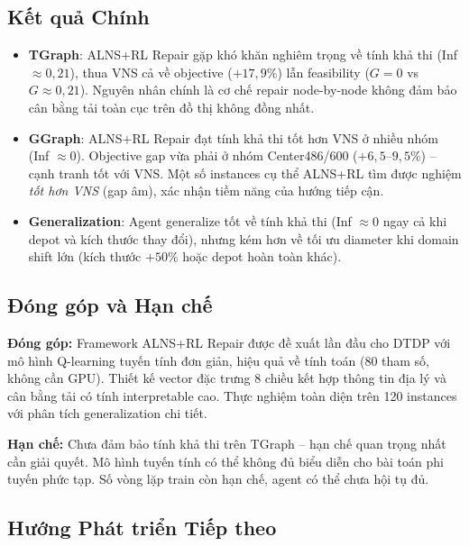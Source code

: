 \documentclass[12pt, a4paper]{article}
\begin{document}
\subsection{Kết quả Chính}

\begin{itemize}
  \item \textbf{TGraph}: ALNS+RL Repair gặp khó khăn nghiêm trọng về tính khả thi
        (Inf $\approx 0{,}21$), thua VNS cả về objective ($+17{,}9\%$) lẫn
        feasibility ($G = 0$ vs $G \approx 0{,}21$). Nguyên nhân chính là cơ chế
        repair node-by-node không đảm bảo cân bằng tải toàn cục trên đồ thị
        không đồng nhất.

  \item \textbf{GGraph}: ALNS+RL Repair đạt tính khả thi tốt hơn VNS ở nhiều
        nhóm (Inf $\approx 0$). Objective gap vừa phải ở nhóm Center486/600
        ($+6{,}5$--$9{,}5\%$) -- cạnh tranh tốt với VNS. Một số instances cụ thể
        ALNS+RL tìm được nghiệm \emph{tốt hơn VNS} (gap âm), xác nhận tiềm năng
        của hướng tiếp cận.

  \item \textbf{Generalization}: Agent generalize tốt về tính khả thi (Inf $\approx 0$
        ngay cả khi depot và kích thước thay đổi), nhưng kém hơn về tối ưu diameter
        khi domain shift lớn (kích thước $+50\%$ hoặc depot hoàn toàn khác).
\end{itemize}

\subsection{Đóng góp và Hạn chế}

\textbf{Đóng góp:} Framework ALNS+RL Repair được đề xuất lần đầu cho DTDP với
mô hình Q-learning tuyến tính đơn giản, hiệu quả về tính toán (80 tham số, không
cần GPU). Thiết kế vector đặc trưng 8 chiều kết hợp thông tin địa lý và cân bằng
tải có tính interpretable cao. Thực nghiệm toàn diện trên 120 instances với phân
tích generalization chi tiết.

\textbf{Hạn chế:} Chưa đảm bảo tính khả thi trên TGraph -- hạn chế quan trọng
nhất cần giải quyết. Mô hình tuyến tính có thể không đủ biểu diễn cho bài toán
phi tuyến phức tạp. Số vòng lặp train còn hạn chế, agent có thể chưa hội tụ đủ.

\subsection{Hướng Phát triển Tiếp theo}
\end{document}
